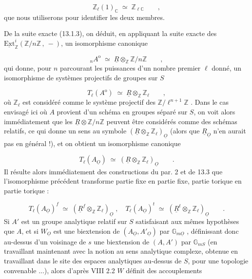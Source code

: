 \begin{equation*}
\mathbb{Z}_{\ell}(1)_{\mathbb{C}} \;\simeq\; \mathbb{Z}_{\ell\mathbb{C}} \qquad ,
\end{equation*}
que nous utiliserons pour identifier les deux membres.

De la suite exacte (13.1.3), on déduit, en appliquant la suite exacte des $\underline{\mathrm{Ext}}^{i}_{\mathbb{Z}}(\mathbb{Z}/n\mathbb{Z}\,,\ -)$, un isomorphisme canonique



\begin{equation}\tag{13.5.5}
{}_{n}A^{\mathrm{o}} \;\simeq\; \underline{R}\otimes_{\mathbb{Z}}\mathbb{Z}/n\mathbb{Z} \qquad ,
\end{equation}
qui donne, pour $n$ parcourant les puissances d'un nombre premier $\ell$ donné, un isomorphisme de systèmes projectifs de groupes sur $S$

\begin{equation}\tag{13.5.6}
T_{\ell}(A^{\mathrm{o}}) \;\simeq\; \underline{R}\otimes_{\mathbb{Z}}\mathbb{Z}_{\ell} \qquad ,
\end{equation}
où $\mathbb{Z}_{\ell}$ est considéré comme le système projectif des $\mathbb{Z}/\ell^{n+1}\mathbb{Z}$ . Dans le cas envisagé ici où $A$ provient d'un schéma en groupes séparé sur $S$, on voit alors immédiatement que les $\underline{R}\otimes\mathbb{Z}/n\mathbb{Z}$ peuvent être considérés comme des schémas relatifs, ce qui donne un sens au symbole $(\underline{R}\otimes_{\mathbb{Z}}\mathbb{Z}_{\ell})_{\underline{O}}$ (alors que $\underline{R}_{\underline{O}}$ n'en aurait pas en général !), et on obtient un isomorphisme canonique

\begin{equation}\tag{13.5.7}
T_{\ell}(A_{\underline{O}}) \;\simeq\; (\underline{R}\otimes_{\mathbb{Z}}\mathbb{Z}_{\ell})_{\underline{O}} \qquad .
\end{equation}
Il résulte alors immédiatement des constructions du par. 2 et de 13.3 que l'isomorphisme précédent transforme partie fixe en partie fixe, partie torique en partie torique :

\begin{equation}\tag{13.5.8}
T_{\ell}(A_{\underline{O}})^{f} \;\simeq\; (\underline{R}^{f}\otimes_{\mathbb{Z}}\mathbb{Z}_{\ell})_{\underline{O}} \;,\quad T_{\ell}(A_{\underline{O}})^{t} \;\simeq\; (\underline{R}^{t}\otimes_{\mathbb{Z}}\mathbb{Z}_{\ell})_{\underline{O}} \qquad .
\end{equation}
Si $A'$ est un groupe analytique relatif sur $S$ satisfaisant aux mêmes hypothèses que $A$, et si $W_{\underline{O}}$ est une biextension de $(A_{\underline{O}},A'_{\underline{O}})$ par $\mathbb{G}_{m\underline{O}}$ , définissant donc au-dessus d'un voisinage de $s$ une biextension de $(A,A')$ par $\mathbb{G}_{mS}$ (en travaillant maintenant avec la notion au sens analytique complexe, obtenue en travaillant dans le site des espaces analytiques au-dessus de $S$, pour une topologie convenable ...), alors d'après VIII 2.2 $W$ définit des accouplements


